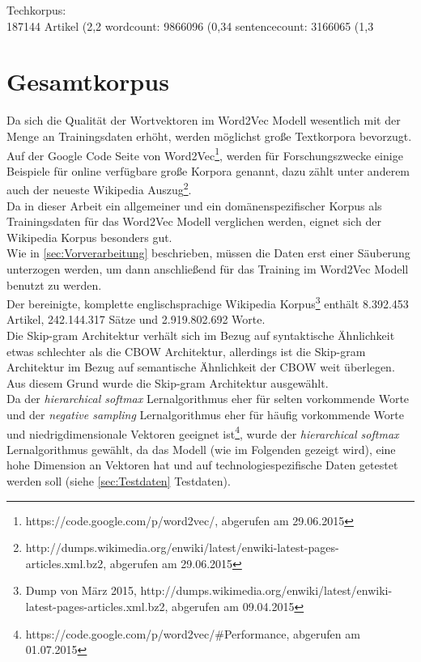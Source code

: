 \documentclass[12pt,a4paper]{report}
\begin{document}
	
	Techkorpus:\\
	187144 Artikel (2,2%
	wordcount: 9866096 (0,34%
	sentencecount: 3166065 (1,3%
\fi
	\section{Gesamtkorpus}
	\label{sec:Gesamtkorpus}
	Da sich die Qualität  der Wortvektoren im Word2Vec Modell wesentlich mit der Menge an Trainingsdaten erhöht\citep{DBLP:journals/corr/abs-1301-3781}, werden möglichst große Textkorpora bevorzugt. Auf der Google Code Seite von Word2Vec\footnote{https://code.google.com/p/word2vec/, abgerufen am 29.06.2015}, werden für Forschungszwecke einige Beispiele für online verfügbare große Korpora genannt, dazu zählt unter anderem auch der neueste Wikipedia Auszug\footnote{http://dumps.wikimedia.org/enwiki/latest/enwiki-latest-pages-articles.xml.bz2, abgerufen am 29.06.2015}.\\
	Da in dieser Arbeit ein allgemeiner und ein domänenspezifischer Korpus als Trainingsdaten für das Word2Vec Modell verglichen werden, eignet sich der Wikipedia Korpus besonders gut. \\
	Wie in \ref{sec:Vorverarbeitung} beschrieben, müssen die Daten erst einer Säuberung unterzogen werden, um dann anschließend für das Training im Word2Vec Modell benutzt zu werden.\\
	 Der bereinigte, komplette englischsprachige Wikipedia Korpus\footnote{Dump von März 2015, http://dumps.wikimedia.org/enwiki/latest/enwiki-latest-pages-articles.xml.bz2, abgerufen am 09.04.2015} enthält 8.392.453 Artikel, 242.144.317 Sätze und 2.919.802.692 Worte.\\


Die Skip-gram Architektur verhält sich im Bezug auf syntaktische Ähnlichkeit etwas schlechter als die CBOW Architektur, allerdings ist die Skip-gram Architektur im Bezug auf semantische Ähnlichkeit der CBOW weit überlegen\citep{DBLP:journals/corr/abs-1301-3781}. Aus diesem Grund wurde die Skip-gram Architektur ausgewählt.\\
Da der \textit{hierarchical softmax} Lernalgorithmus eher für selten vorkommende Worte und der \textit{negative sampling} Lernalgorithmus eher für häufig vorkommende Worte und niedrigdimensionale Vektoren geeignet ist\footnote{https://code.google.com/p/word2vec/\#Performance, abgerufen am 01.07.2015}, wurde der  \textit{hierarchical softmax} Lernalgorithmus gewählt, da das Modell (wie im Folgenden gezeigt wird), eine hohe Dimension an Vektoren hat und auf technologiespezifische Daten getestet werden soll (siehe \ref{sec:Testdaten} Testdaten).\\
\end{document}

